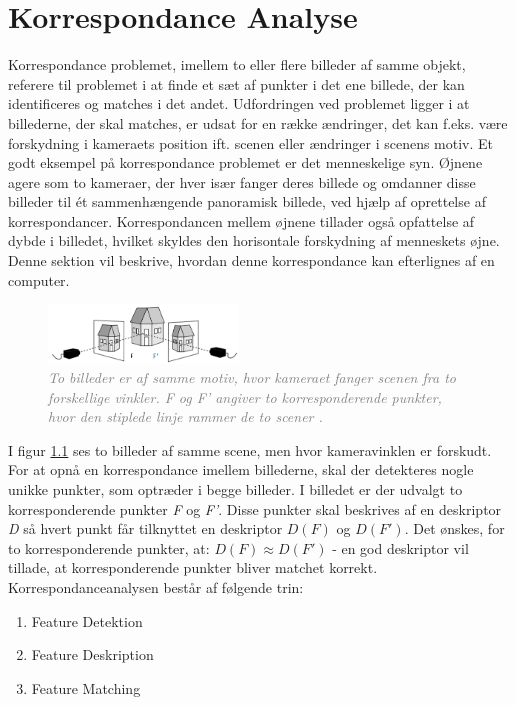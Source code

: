 \chapter{Korrespondance Analyse} \label{sec:Kor}
Korrespondance problemet, imellem to eller flere billeder af samme objekt, referere til problemet i at finde et sæt af punkter i det ene billede, der kan identificeres og matches i det andet.
Udfordringen ved problemet ligger i at billederne, der skal matches, er udsat for en række ændringer, det kan f.eks. være forskydning i kameraets position ift. scenen eller  ændringer i scenens motiv. Et godt eksempel på korrespondance problemet er det menneskelige syn. Øjnene agere som to kameraer, der hver især fanger deres billede og omdanner disse billeder til ét sammenhængende panoramisk billede, ved hjælp af oprettelse af korrespondancer. Korrespondancen mellem øjnene tillader også opfattelse af dybde i billedet, hvilket skyldes den horisontale forskydning af menneskets øjne. Denne sektion vil beskrive, hvordan denne korrespondance kan efterlignes af en computer.
\begin{figure}[H]
    \centering
    \includegraphics[width=0.45\textwidth]{fig/3.png}
     \vspace{-1em}
    \begin{center}    
       \caption{\textcolor{gray}{\footnotesize \textit{To billeder er af samme motiv, hvor kameraet fanger scenen fra to forskellige vinkler. F og F' angiver to korresponderende punkter, hvor den stiplede linje rammer de to scener \cite{kim}.}}}
    \label{fig:1}
     \end{center}
     \vspace{-2.5em}
  \end{figure} \noindent
I figur \ref{fig:1} ses to billeder af samme scene, men hvor kameravinklen er forskudt. For at opnå en korrespondance imellem billederne, skal der detekteres nogle unikke punkter, som optræder i begge billeder. I billedet er der udvalgt to korresponderende punkter \textit{F} og \textit{F'}. Disse punkter skal beskrives af en deskriptor \textit{D} så hvert punkt får tilknyttet en deskriptor $D(F)$ og $D(F')$. Det ønskes, for to korresponderende punkter, at: $D(F)\approx D(F')$ - en god deskriptor vil tillade, at korresponderende punkter bliver matchet korrekt. Korrespondanceanalysen består af følgende trin:
\begin{enumerate}
\item{Feature Detektion}
\item{Feature Deskription}
\item{Feature Matching}
\end{enumerate}
